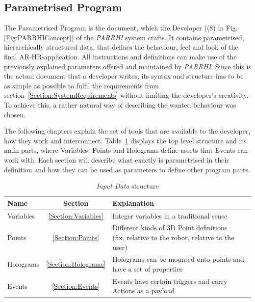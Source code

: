 \subsection{Parametrised Program}
\label{Chap:ParametrisedProgram}
The Parametrised Program is the document, which the Developer ((8) in Fig. \ref{Fig:PARRHIConcept}) of the \textit{PARRHI} system crafts. It contains parametrised, hierarchically structured data, that defines the behaviour, feel and look of the final AR-HR-application. All instructions and definitions can make use of the previously explained parameters offered and maintained by \textit{PARRHI}. Since this is the actual document that a developer writes, its syntax and structure has to be as simple as possible to fulfil the requirements from section~\ref{Section:SystemRequirements} without limiting the developer's creativity. To achieve this, a rather natural way of describing the wanted behaviour was chosen. 

The following chapters explain the set of tools that are available to the developer, how they work and interconnect. Table~\ref{Table:InputDataStructure} displays the top level structure and its main parts, where Variables, Points and Holograms define assets that Events can work with. Each section will describe what exactly is parametrised in their definition and how they can be used as parameters to define other program parts.

\begin{table}[ht]
	\caption{\textit{Input Data} structure}
	\label{Table:InputDataStructure}
	\centering
	\begin{tabular}{lcl}
		\toprule
		Name & Section		& Explanation	\\		
		\midrule
		Variables & \ref{Section:Variables}		& Integer variables in a traditional sense \\
		Points& \ref{Section:Points}		& \parbox[t]{10cm}{Different kinds of 3D Point definitions\\(fix, relative to the robot, relative to the user)} 	 \\
		Holograms& \ref{Section:Holograms} & Holograms can be mounted onto points and have a set of properties\\
		Events& \ref{Section:Events} & Events have certain triggers and carry Actions as a payload \\
		\bottomrule
	\end{tabular}
\end{table}

